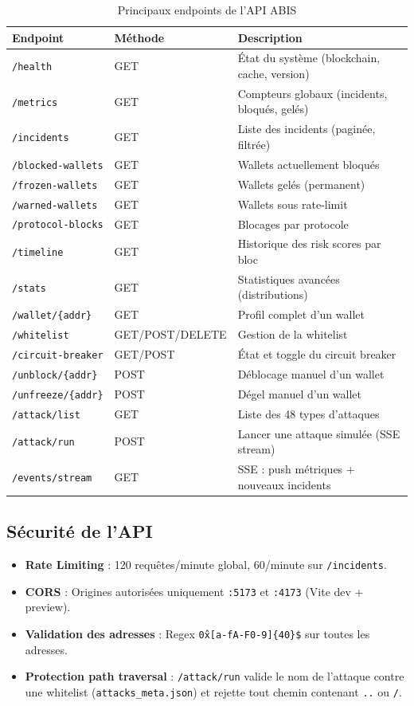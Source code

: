 \documentclass[12pt,a4paper]{report}
\newcommand{\code}[1]{\texttt{#1}}
\begin{document}
\begin{table}[H]
\centering
\caption{Principaux endpoints de l'API ABIS}
\label{tab:api_endpoints}
\begin{tabularx}{\linewidth}{L{5cm} C{1.5cm} L{6.5cm}}
\toprule
\textbf{Endpoint} & \textbf{Méthode} & \textbf{Description} \\
\midrule
\code{/health} & GET & État du système (blockchain, cache, version) \\
\code{/metrics} & GET & Compteurs globaux (incidents, bloqués, gelés) \\
\code{/incidents} & GET & Liste des incidents (paginée, filtrée) \\
\code{/blocked-wallets} & GET & Wallets actuellement bloqués \\
\code{/frozen-wallets} & GET & Wallets gelés (permanent) \\
\code{/warned-wallets} & GET & Wallets sous rate-limit \\
\code{/protocol-blocks} & GET & Blocages par protocole \\
\code{/timeline} & GET & Historique des risk scores par bloc \\
\code{/stats} & GET & Statistiques avancées (distributions) \\
\code{/wallet/\{addr\}} & GET & Profil complet d'un wallet \\
\code{/whitelist} & GET/POST/DELETE & Gestion de la whitelist \\
\code{/circuit-breaker} & GET/POST & État et toggle du circuit breaker \\
\code{/unblock/\{addr\}} & POST & Déblocage manuel d'un wallet \\
\code{/unfreeze/\{addr\}} & POST & Dégel manuel d'un wallet \\
\code{/attack/list} & GET & Liste des 48 types d'attaques \\
\code{/attack/run} & POST & Lancer une attaque simulée (SSE stream) \\
\code{/events/stream} & GET & SSE : push métriques + nouveaux incidents \\
\bottomrule
\end{tabularx}
\end{table}

\subsection{Sécurité de l'API}

\begin{itemize}
  \item \textbf{Rate Limiting} : 120 requêtes/minute global, 60/minute sur \code{/incidents}.
  \item \textbf{CORS} : Origines autorisées uniquement \code{:5173} et \code{:4173} (Vite dev + preview).
  \item \textbf{Validation des adresses} : Regex \texttt{\^0x[a-fA-F0-9]\{40\}\$} sur toutes les adresses.
  \item \textbf{Protection path traversal} : \code{/attack/run} valide le nom de l'attaque contre une whitelist (\code{attacks\_meta.json}) et rejette tout chemin contenant \texttt{..} ou \texttt{/}.
\end{itemize}
\end{document}
